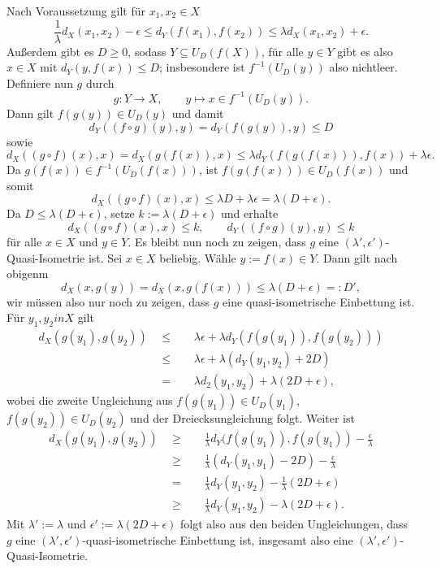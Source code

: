 \documentclass[11pt]{book}
\numberwithin{dummy}{section}
\theoremstyle{nonumberbreak}
\newenvironment{prob}[1][]{\ifthenelse{\equal{#1}{}}{\problem}{\problem[#1]}\rm}{\endproblem}
\newenvironment{sol}[1][]{\ifthenelse{\equal{#1}{}}{\solution}{\solution[#1]}\rm}{\endsolution}
\newcommand{\la}{\longrightarrow}
\begin{document}
\begin{spacing}{1.4}
\begin{prob}
\begin{sol}
\begin{compactenum}
\item Nach Voraussetzung gilt für $x_1, x_2 \in X$
$$\frac{1}{\lambda} d_X(x_1,x_2) - \epsilon \leqslant d_Y(f(x_1),f(x_2)) \leqslant \lambda d_X(x_1,x_2) + \epsilon.$$
Außerdem gibt es $D \geqslant 0$, sodass $Y\subseteq U_D(f(X))$, für alle $y \in Y$ gibt es also $x\in X$ mit $d_Y(y,f(x))\leqslant D$; insbesondere ist $f^{-1}(U_D(y))$ also nichtleer. Definiere nun $g$ durch 
$$g: Y \la X, \qquad y \mapsto x \in f^{-1}(U_D(y)).$$
Dann gilt $f(g(y)) \in U_D(y)$ und damit
$$d_Y((f\circ g)(y),y) = d_Y(f(g(y)),y) \leqslant D$$
sowie
$$d_X((g\circ f)(x),x) = d_X(g(f(x)),x) \leqslant \lambda d_Y\left(f(g(f(x))),f(x)\right)+\lambda \epsilon.$$
Da $g(f(x)) \in f^{-1}\left(U_D(f(x))\right)$, ist $f(g(f(x))) \in U_D(f(x))$ und somit 
$$d_X((g\circ f)(x),x) \leqslant \lambda D + \lambda \epsilon = \lambda (D+\epsilon).$$ 
Da $D\leqslant \lambda(D+\epsilon)$, setze $k:= \lambda (D+\epsilon)$ und erhalte
$$d_X((g\circ f)(x),x) \leqslant k, \qquad d_Y((f\circ g)(y),y) \leqslant k$$
für alle $x \in X$ und $y \in Y$. Es bleibt nun noch zu zeigen, dass $g$ eine $(\lambda', \epsilon')$-Quasi-Isometrie ist. Sei $x \in X$ beliebig. Wähle $y:=f(x) \in Y$. Dann gilt nach obigenm
$$d_X(x,g(y))=d_X(x,g(f(x))) \leqslant \lambda(D+\epsilon)=: D',$$
wir müssen also nur noch zu zeigen, dass $g$ eine quasi-isometrische Einbettung ist. Für $y_1,y_2 in X$ gilt
\begin{alignat*}{5}
d_X(g(y_1),g(y_2)) \ \ &\leqslant&& \ \ \lambda \epsilon + \lambda d_Y\left(f(g(y_1)), f(g(y_2))\right) \\
&\leqslant && \ \ \lambda \epsilon + \lambda \left( d_Y(y_1,y_2) + 2D\right)\\
&=&&\ \ \lambda d_2(y_1,y_2) +\lambda (2D+\epsilon),
\end{alignat*}
wobei die zweite Ungleichung aus $f(g(y_1)) \in U_D(y_1)$, $f(g(y_2)) \in U_D(y_2)$ und der Dreiecksungleichung folgt. Weiter ist 
\begin{alignat*}{5}
d_X(g(y_1), g(y_2)) \ \ &\geqslant&& \ \ \frac{1}{\lambda} d_Y(f(g(y_1)), f(g(y_1)) - \frac{\epsilon}{\lambda} \\
&\geqslant&& \ \ \frac{1}{\lambda} \left( d_Y(y_1,y_1) - 2D\right) - \frac{\epsilon}{\lambda} \\
&=&& \ \ \frac{1}{\lambda} d_Y(y_1,y_2) - \frac{1}{\lambda} (2D+\epsilon) \\
&\geqslant&& \ \ \frac{1}{\lambda}d_Y(y_1,y_2) - \lambda(2D+\epsilon).
\end{alignat*}
Mit $\lambda':=\lambda$ und $\epsilon':=\lambda(2D+\epsilon)$ folgt also aus den beiden Ungleichungen, dass $g$ eine $(\lambda',\epsilon')$-quasi-isometrische Einbettung ist, insgesamt also eine $(\lambda',\epsilon')$-Quasi-Isometrie.


\end{compactenum}
\end{sol}
\end{prob}
\end{spacing}
\end{document}
